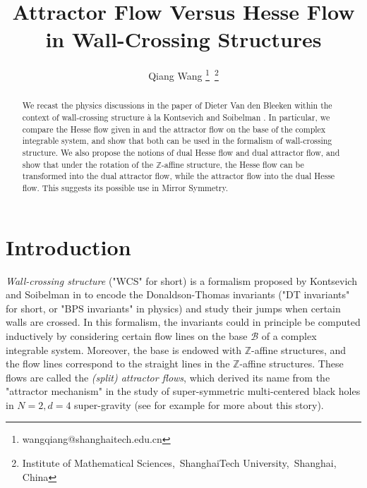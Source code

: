 \documentclass{article}
\title{Attractor Flow Versus Hesse Flow in Wall-Crossing Structures}
\author{Qiang Wang \thanks{wangqiang@shanghaitech.edu.cn}\,\,\,\thanks{Institute of Mathematical Sciences,\, ShanghaiTech University,\, Shanghai, China}}
\begin{document}
\maketitle

\newtheorem{theorem}{Theorem}[section]
\newtheorem{corollary}{Corollary}[theorem]
\newtheorem{lemma}[theorem]{Lemma}
\newtheorem{remark}{Remark}[section]
\newtheorem{proposition}[theorem]{Proposition}
\newtheorem{definition}{Definition}[section]

\begin{abstract}
We recast the physics discussions in the paper of Dieter Van den Bleeken \cite{svan2012bps} within the context of wall-crossing structure à la Kontsevich and Soibelman \cite{kontsevich2014wall}. In particular, we compare the Hesse flow given in \cite{svan2012bps} and the attractor flow on the base of the complex integrable system, and show that both can be used in the formalism of wall-crossing structure. We also propose the notions of dual Hesse flow and dual attractor flow, and show that under the rotation of the $\mathbb{Z}$-affine structure, the Hesse flow can be transformed into the dual attractor flow, while the attractor flow into the dual Hesse flow. This suggests its possible use in Mirror Symmetry. 
\end{abstract}




\section{Introduction}
\textit{Wall-crossing structure} ("WCS" for short) is a formalism proposed by Kontsevich and Soibelman in \cite{kontsevich2014wall} to encode the Donaldson-Thomas invariants ("DT invariants" for short, or "BPS invariants" in physics) and study their jumps when certain walls are crossed. In this formalism, the invariants could in principle be computed inductively by considering certain flow lines on the base $\mathcal{B}$ of a complex integrable system. Moreover, the base is endowed with $\mathbb{Z}$-affine structures, and the flow lines correspond to the straight lines in the $\mathbb{Z}$-affine structures. These flows are called the \textit{(split) attractor flows}, which derived its name from the "attractor mechanism" in the study of super-symmetric multi-centered black holes in $N=2, d=4$ super-gravity (see for example \cite{denef2011split}\cite{denef2000supergravity}\cite{moore1998arithmetic} for more about this story). 
\end{document}
